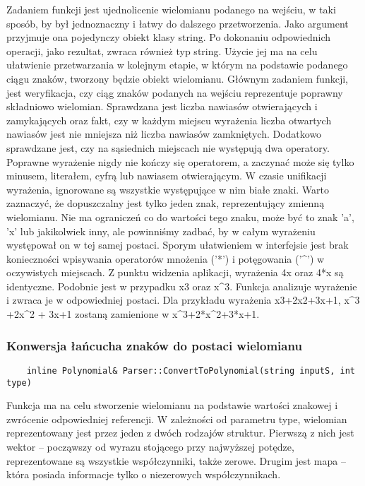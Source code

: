 \documentclass[oneside,a4paper]{book}
\begin{document}
	Zadaniem funkcji jest ujednolicenie wielomianu podanego na wejściu, w taki sposób, by był jednoznaczny i łatwy do dalszego przetworzenia. Jako argument przyjmuje ona pojedynczy obiekt klasy string. Po dokonaniu odpowiednich operacji, jako rezultat, zwraca również typ string. Użycie jej ma na celu ułatwienie przetwarzania w kolejnym etapie, w którym na podstawie podanego ciągu znaków, tworzony będzie obiekt wielomianu. Głównym zadaniem funkcji, jest weryfikacja, czy ciąg znaków podanych na wejściu reprezentuje poprawny składniowo wielomian. Sprawdzana jest liczba nawiasów otwierających i zamykających oraz fakt, czy w każdym miejscu wyrażenia liczba otwartych nawiasów jest nie mniejsza niż liczba nawiasów zamkniętych. Dodatkowo sprawdzane jest, czy na sąsiednich miejscach nie występują dwa operatory. Poprawne wyrażenie nigdy nie kończy się operatorem, a zaczynać może się tylko minusem, literałem, cyfrą lub nawiasem otwierającym. W czasie unifikacji wyrażenia, ignorowane są wszystkie występujące w nim białe znaki. Warto zaznaczyć, że dopuszczalny jest tylko jeden znak, reprezentujący zmienną wielomianu. Nie ma ograniczeń co do wartości tego znaku, może być to znak 'a', 'x' lub jakikolwiek inny, ale powinniśmy zadbać, by w całym wyrażeniu występował on w tej samej postaci. Sporym ułatwieniem w interfejsie jest brak konieczności wpisywania operatorów mnożenia ('*') i potęgowania ('\^{}') w oczywistych miejscach. Z punktu widzenia aplikacji, wyrażenia 4x oraz 4*x są identyczne. Podobnie jest w przypadku x3 oraz x\^{}3. Funkcja analizuje wyrażenie i zwraca je w odpowiedniej postaci. Dla przykładu wyrażenia x3+2x2+3x+1, x\^{}3 +2x\^{}2 + 3x+1 zostaną zamienione w x\^{}3+2*x\^{}2+3*x+1.
	\\
	
	\subsubsection{Konwersja łańcucha znaków do postaci wielomianu}
	\begin{lstlisting}
	inline Polynomial& Parser::ConvertToPolynomial(string inputS, int type)
	\end{lstlisting}
	
	Funkcja ma na celu stworzenie wielomianu na podstawie wartości znakowej i zwrócenie odpowiedniej referencji. W zależności od parametru type, wielomian reprezentowany jest przez jeden z dwóch rodzajów struktur. Pierwszą z nich jest wektor -- począwszy od wyrazu stojącego przy najwyższej potędze, reprezentowane są wszystkie współczynniki, także zerowe. Drugim jest mapa -- która posiada informacje tylko o niezerowych współczynnikach.
	
\end{document}
